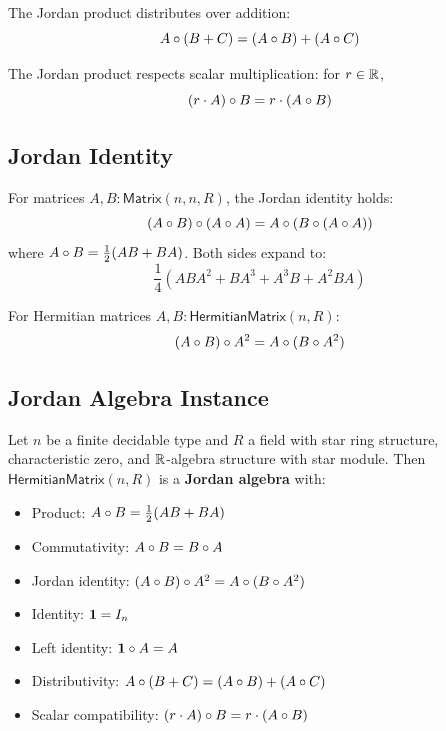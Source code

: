 \begin{theorem}
The Jordan product distributes over addition:
\[ A \circ (B + C) = (A \circ B) + (A \circ C) \]
\end{theorem}

\begin{theorem}
The Jordan product respects scalar multiplication: for $r \in \mathbb{R}$,
\[ (r \cdot A) \circ B = r \cdot (A \circ B) \]
\end{theorem}

\subsection{Jordan Identity}

\begin{theorem}
For matrices $A, B : \mathsf{Matrix}(n, n, R)$, the Jordan identity holds:
\[ (A \circ B) \circ (A \circ A) = A \circ (B \circ (A \circ A)) \]
where $A \circ B = \frac{1}{2}(AB + BA)$. Both sides expand to:
\[ \frac{1}{4}(ABA^2 + BA^3 + A^3B + A^2BA) \]
\end{theorem}

\begin{theorem}
For Hermitian matrices $A, B : \mathsf{HermitianMatrix}(n, R)$:
\[ (A \circ B) \circ A^{2} = A \circ (B \circ A^{2}) \]
\end{theorem}

\subsection{Jordan Algebra Instance}

\begin{proposition}[jordanAlgebraHermitianMatrix]
Let $n$ be a finite decidable type and $R$ a field with star ring structure, characteristic zero, and $\mathbb{R}$-algebra structure with star module. Then $\mathsf{HermitianMatrix}(n, R)$ is a \textbf{Jordan algebra} with:
\begin{itemize}
  \item Product: $A \circ B = \frac{1}{2}(AB + BA)$
  \item Commutativity: $A \circ B = B \circ A$
  \item Jordan identity: $(A \circ B) \circ A^{2} = A \circ (B \circ A^{2})$
  \item Identity: $\mathbf{1} = I_n$
  \item Left identity: $\mathbf{1} \circ A = A$
  \item Distributivity: $A \circ (B + C) = (A \circ B) + (A \circ C)$
  \item Scalar compatibility: $(r \cdot A) \circ B = r \cdot (A \circ B)$
\end{itemize}
\end{proposition}
